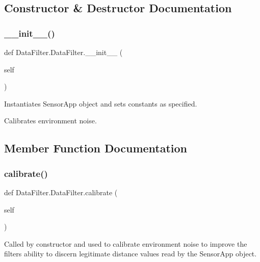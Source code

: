\subsection{Constructor \& Destructor Documentation}
\mbox{\label{class_data_filter_1_1_data_filter_ac410f2a7e9574299ee6aff0aff11d3a9}} 
\subsubsection{\texorpdfstring{\+\_\+\+\_\+init\+\_\+\+\_\+()}{\_\_init\_\_()}}
{\footnotesize\ttfamily def Data\+Filter.\+Data\+Filter.\+\_\+\+\_\+init\+\_\+\+\_\+ (\begin{DoxyParamCaption}\item[{}]{self }\end{DoxyParamCaption})}



Instantiates Sensor\+App object and sets constants as specified. 

Calibrates environment noise. 

\subsection{Member Function Documentation}
\mbox{\label{class_data_filter_1_1_data_filter_a3e2775cb10b099daeb8a7bcf9aa5fe9f}} 
\subsubsection{\texorpdfstring{calibrate()}{calibrate()}}
{\footnotesize\ttfamily def Data\+Filter.\+Data\+Filter.\+calibrate (\begin{DoxyParamCaption}\item[{}]{self }\end{DoxyParamCaption})}



Called by constructor and used to calibrate environment noise to improve the filter\textquotesingle{}s ability to discern legitimate distance values read by the Sensor\+App object. 

